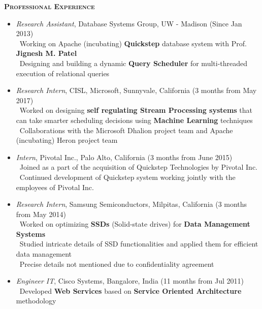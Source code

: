\documentclass[11pt]{article}
\newcommand{\graybox}[1]{\begin{mdframed}[backgroundcolor=light-gray, linecolor=light-gray, roundcorner=10pt, shadow=false, shadowsize=1pt]
\Large{\textbf{\textsc{#1}}}
\end{mdframed}}
\begin{document}
\graybox{Professional Experience}
\begin{itemize}\addtolength{\itemsep}{-0.5\baselineskip}
	\item{\textit{Research Assistant}, Database Systems Group, UW - Madison \hfill (Since Jan 2013)}\\
		\textendash\ Working on Apache (incubating) \textbf{Quickstep} database system with Prof. \textbf{Jignesh M. Patel} \\
		\textendash\ Designing and building a dynamic \textbf{Query Scheduler} for multi-threaded execution of relational queries \\
	\item{\textit{Research Intern}, CISL, Microsoft, Sunnyvale, California \hfill (3 months from May 2017)}\\
	\textendash\ Worked on designing \textbf{self regulating Stream Processing systems} that can take smarter scheduling decisions using \textbf{Machine Learning} techniques \\
	\textendash\ Collaborations with the Microsoft Dhalion project team and Apache (incubating) Heron project team\\
	\item{\textit{Intern}, Pivotal Inc., Palo Alto, California \hfill (3 months from June 2015)}\\
	\textendash\ Joined as a part of the acquisition of Quickstep Technologies by Pivotal Inc.\\
	\textendash\ Continued development of Quickstep system working jointly with the employees of Pivotal Inc.\\
	\item{\textit{Research Intern}, Samsung Semiconductors, Milpitas, California \hfill (3 months from May 2014)}\\
		\textendash\ Worked on optimizing \textbf{SSDs} (Solid-state drives) for \textbf{Data Management Systems} \\
		\textendash\ Studied intricate details of SSD functionalities and applied them for efficient data management \\
		\textendash\ Precise details not mentioned due to confidentiality agreement\\
	\item{\textit{Engineer IT}, Cisco Systems, Bangalore, India \hfill (11 months from Jul 2011)}\\
		\textendash\ Developed \textbf{Web Services} based on \textbf{Service Oriented Architecture} methodology\\

\end{itemize}
\end{document}
